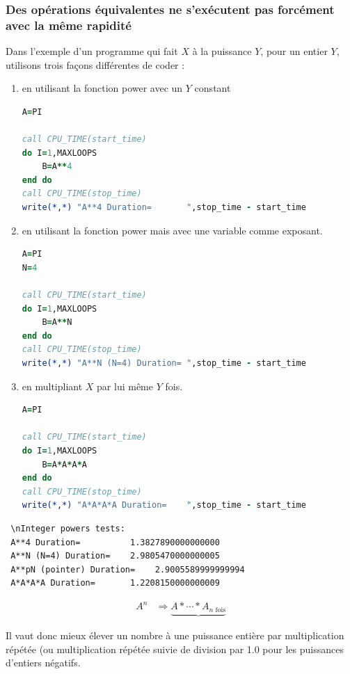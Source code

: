 \documentclass[a4paper,twoside]{article}
\begin{document}
\subsubsection{Des opérations équivalentes ne s'exécutent pas forcément avec la même rapidité}
Dans l'exemple d'un programme qui fait $X$ à la puissance $Y$, pour un entier $Y$, utilisons trois façons différentes de coder :
\begin{enumerate}
\item en utilisant la fonction power avec un $Y$ constant
\begin{lstlisting}[language=Fortran]
A=PI

call CPU_TIME(start_time)
do I=1,MAXLOOPS
    B=A**4
end do
call CPU_TIME(stop_time)
write(*,*) "A**4 Duration=       ",stop_time - start_time
\end{lstlisting}

\item en utilisant la fonction power mais avec une variable comme exposant.
\begin{lstlisting}[language=Fortran]
A=PI
N=4

call CPU_TIME(start_time)
do I=1,MAXLOOPS
    B=A**N
end do
call CPU_TIME(stop_time)
write(*,*) "A**N (N=4) Duration= ",stop_time - start_time
\end{lstlisting}

\item en multipliant $X$ par lui même $Y$ fois.
\begin{lstlisting}[language=Fortran]
A=PI

call CPU_TIME(start_time)
do I=1,MAXLOOPS
    B=A*A*A*A
end do
call CPU_TIME(stop_time)
write(*,*) "A*A*A*A Duration=    ",stop_time - start_time
\end{lstlisting}

\end{enumerate}

\begin{verbatim}
 \nInteger powers tests:
 A**4 Duration=          1.3827890000000000     
 A**N (N=4) Duration=    2.9805470000000005     
 A**pN (pointer) Duration=    2.9005589999999994     
 A*A*A*A Duration=       1.2208150000000009     
\end{verbatim}

\begin{important}
\begin{align}
A^n & \Rightarrow \underbrace{A * \cdots * A_{\text{$n$ fois}}}
\end{align}

Il vaut donc mieux élever un nombre à une puissance entière par multiplication répétée (ou multiplication répétée suivie de division par 1.0 pour les puissances d'entiers négatifs.
\end{important}
\end{document}
